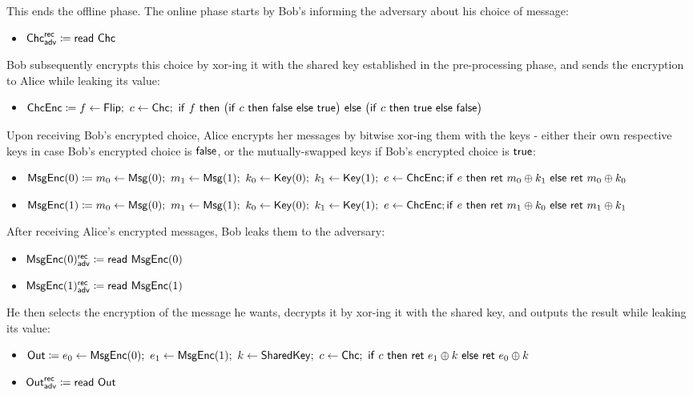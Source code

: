 This ends the offline phase. The online phase starts by Bob's informing the adversary about his choice of message:
\begin{itemize}
\item {\color{blue} $\mathsf{Chc}^{\mathsf{rec}}_{\mathsf{adv}} \coloneqq \mathsf{read} \ \mathsf{Chc}$}
\end{itemize}
Bob subsequently encrypts this choice by xor-ing it with the shared key established in the pre-processing phase, and sends the encryption to Alice while leaking its value:
\begin{itemize}
\item $\ChcEnc \coloneqq f \leftarrow \Flip; \ c \leftarrow \Chc; \ \ifte{f}{\big(\ifte{c}{\false}{\true}\big)}{\big(\ifte{c}{\true}{\false}\big)}$
\end{itemize}
Upon receiving Bob's encrypted choice, Alice encrypts her messages by bitwise xor-ing them with the keys - either their own respective keys in case Bob's encrypted choice is $\mathsf{false}$, or the mutually-swapped keys if Bob's encrypted choice is $\mathsf{true}$:
\begin{itemize}
\item $\mathsf{MsgEnc}(0) \coloneqq m_0 \leftarrow \mathsf{Msg}(0); \ m_1 \leftarrow \mathsf{Msg}(1); \ k_0 \leftarrow \mathsf{Key}(0); \ k_1 \leftarrow \mathsf{Key}(1); \ e \leftarrow \mathsf{ChcEnc}; \\ \mathsf{if} \ e \ \mathsf{then} \ \mathsf{ret} \ m_0 \oplus k_1 \ \mathsf{else} \ \mathsf{ret} \ m_0 \oplus k_0$
\item $\mathsf{MsgEnc}(1) \coloneqq m_0 \leftarrow \mathsf{Msg}(0); \ m_1 \leftarrow \mathsf{Msg}(1); \ k_0 \leftarrow \mathsf{Key}(0); \ k_1 \leftarrow \mathsf{Key}(1); \ e \leftarrow \mathsf{ChcEnc}; \\ \mathsf{if} \ e \ \mathsf{then} \ \mathsf{ret} \ m_1 \oplus k_0 \ \mathsf{else} \ \mathsf{ret} \ m_1 \oplus k_1$
\end{itemize}
After receiving Alice's encrypted messages, Bob leaks them to the adversary:
\begin{itemize}
\item {\color{blue} $\mathsf{MsgEnc}(0)^{\mathsf{rec}}_{\mathsf{adv}} \coloneqq \mathsf{read} \ \mathsf{MsgEnc}(0)$}
\item {\color{blue} $\mathsf{MsgEnc}(1)^{\mathsf{rec}}_{\mathsf{adv}} \coloneqq \mathsf{read} \ \mathsf{MsgEnc}(1)$}
\end{itemize}
He then selects the encryption of the message he wants, decrypts it by xor-ing it with the shared key, and outputs the result while leaking its value:
\begin{itemize}
\item $\mathsf{Out} \coloneqq e_0 \leftarrow \mathsf{MsgEnc}(0); \ e_1 \leftarrow \mathsf{MsgEnc}(1); \ k \leftarrow \mathsf{SharedKey}; \ c \leftarrow \mathsf{Chc}; \ \mathsf{if} \ c \ \mathsf{then} \ \mathsf{ret} \ e_1 \oplus k \ \mathsf{else} \ \mathsf{ret} \ e_0 \oplus k$
\item {\color{blue} $\mathsf{Out}^{\mathsf{rec}}_{\mathsf{adv}} \coloneqq \mathsf{read} \ \mathsf{Out}$}
\end{itemize}
